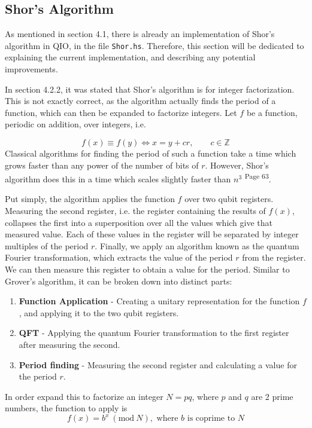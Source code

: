 \documentclass[a4paper,10pt, titlepage, twoside]{article}
\newcommand{\Mod}[1]{\ (\mathrm{mod}\ #1)}
\begin{document}
\subsection{Shor's Algorithm}
As mentioned in section 4.1, there is already an implementation of Shor's algorithm in QIO, in the file \texttt{Shor.hs}. Therefore, this section will be dedicated to explaining the current implementation, and describing any potential improvements.\par
In section 4.2.2, it was stated that Shor's algorithm is for integer factorization. This is not exactly correct, as the algorithm actually finds the period of a function, which can then be expanded to factorize integers. Let $f$ be a function, periodic on addition, over integers, i.e.\par
$$f(x) \equiv f(y) \iff x = y + cr, \qquad c \in \mathbb{Z} $$
Classical algorithms for finding the period of such a function take a time which grows faster than any power of the number of bits of $r$. However, Shor's algorithm does this in a time which scales slightly faster than $n^3$ \cite{qscbook}\textsuperscript{Page 63}.\par
Put simply, the algorithm applies the function $f$ over two qubit registers. Measuring the second register, i.e. the register containing the results of $f(x)$, collapses the first into a superposition over all the values which give that measured value. Each of these values in the register will be separated by integer multiples of the period $r$. Finally, we apply an algorithm known as the quantum Fourier transformation, which extracts the value of the period $r$ from the register. We can then measure this register to obtain a value for the period. Similar to Grover's algorithm, it can be broken down into distinct parts:\par
\begin{enumerate}
    \item \textbf{Function Application} - Creating a unitary representation for the function $f$, and applying it to the two qubit registers.
    \item \textbf{QFT} - Applying the quantum Fourier transformation to the first register after measuring the second.
    \item \textbf{Period finding} - Measuring the second register and calculating a value for the period $r$.
\end{enumerate}
In order expand this to factorize an integer $N = pq$, where $p$ and $q$ are 2 prime numbers, the function to apply is
$$f(x) = b^x \Mod N, \text{ where $b$ is coprime to $N$}$$
\end{document}
